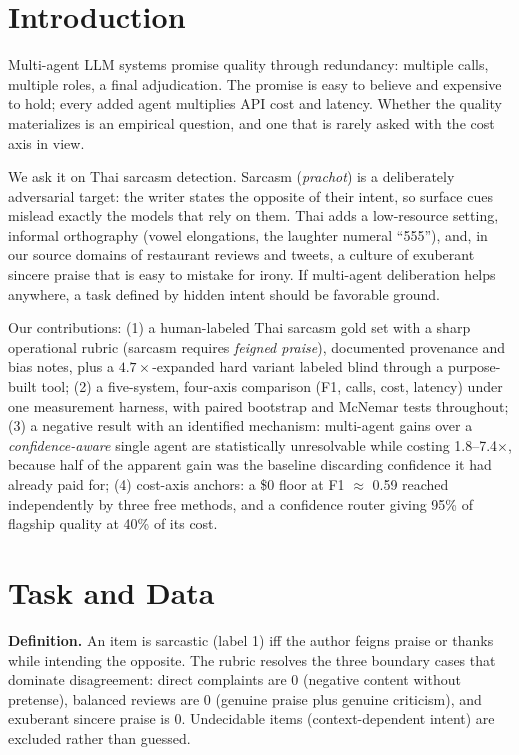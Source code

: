 \documentclass[10pt]{article}
\begin{document}
\section{Introduction}
Multi-agent LLM systems promise quality through redundancy: multiple calls, multiple roles, a final
adjudication. The promise is easy to believe and expensive to hold; every added agent multiplies API
cost and latency. Whether the quality materializes is an empirical question, and one that is rarely
asked with the cost axis in view.

We ask it on Thai sarcasm detection. Sarcasm (\emph{prachot}) is a deliberately adversarial target:
the writer states the opposite of their intent, so surface cues mislead exactly the models that rely
on them. Thai adds a low-resource setting, informal orthography (vowel elongations, the laughter
numeral ``555''), and, in our source domains of restaurant reviews and tweets, a culture of
exuberant sincere praise that is easy to mistake for irony. If multi-agent deliberation helps
anywhere, a task defined by hidden intent should be favorable ground.

Our contributions:
(1) a human-labeled Thai sarcasm gold set with a sharp operational rubric (sarcasm requires
\emph{feigned praise}), documented provenance and bias notes, plus a $4.7\times$-expanded hard
variant labeled blind through a purpose-built tool;
(2) a five-system, four-axis comparison (F1, calls, cost, latency) under one measurement harness,
with paired bootstrap and McNemar tests throughout;
(3) a negative result with an identified mechanism: multi-agent gains over a
\emph{confidence-aware} single agent are statistically unresolvable while costing 1.8--7.4$\times$,
because half of the apparent gain was the baseline discarding confidence it had already paid for;
(4) cost-axis anchors: a \$0 floor at F1 $\approx$ 0.59 reached independently by three free methods,
and a confidence router giving 95\% of flagship quality at 40\% of its cost.

\section{Task and Data}
\textbf{Definition.} An item is sarcastic (label 1) iff the author feigns praise or thanks while
intending the opposite. The rubric resolves the three boundary cases that dominate disagreement:
direct complaints are 0 (negative content without pretense), balanced reviews are 0 (genuine praise
plus genuine criticism), and exuberant sincere praise is 0. Undecidable items (context-dependent
intent) are excluded rather than guessed.
\end{document}
